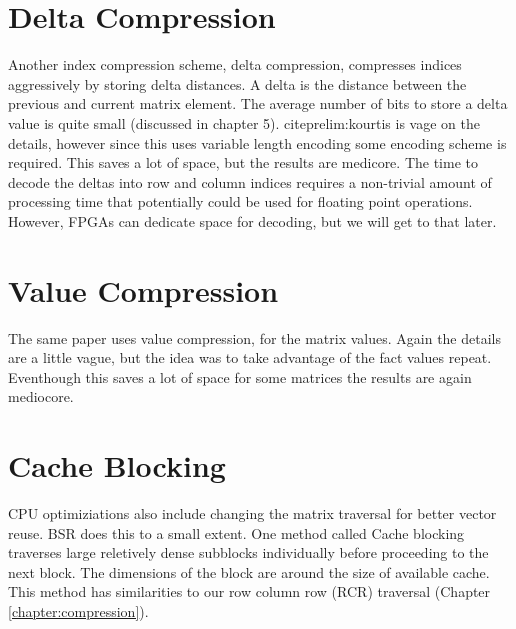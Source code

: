 \section{Delta Compression}
\par Another index compression scheme, delta compression, compresses indices aggressively by storing delta distances. A delta is the distance between the previous and current matrix element. The average number of bits to store a delta value is quite small (discussed in chapter 5). cite{prelim:kourtis} is vage on the details, however since this uses variable length encoding some encoding scheme is required. This saves a lot of space, but the results are medicore. The time to decode the deltas into row and column indices requires a non-trivial amount of processing time that potentially could be used for floating point operations. However, FPGAs can dedicate space for decoding, but we will get to that later.
\section{Value Compression}
\par The same paper uses value compression, for the matrix values. Again the details are a little vague, but the idea was to take advantage of the fact values repeat. Eventhough this saves a lot of space for some matrices the results are again mediocore.
\section{Cache Blocking}
\par CPU optimiziations also include changing the matrix traversal for better vector reuse. BSR does this to a small extent. One method called Cache blocking traverses large reletively dense subblocks individually before proceeding to the next block. The dimensions of the block are around the size of available cache. This method has similarities to our row column row (RCR) traversal (Chapter \ref{chapter:compression}).
